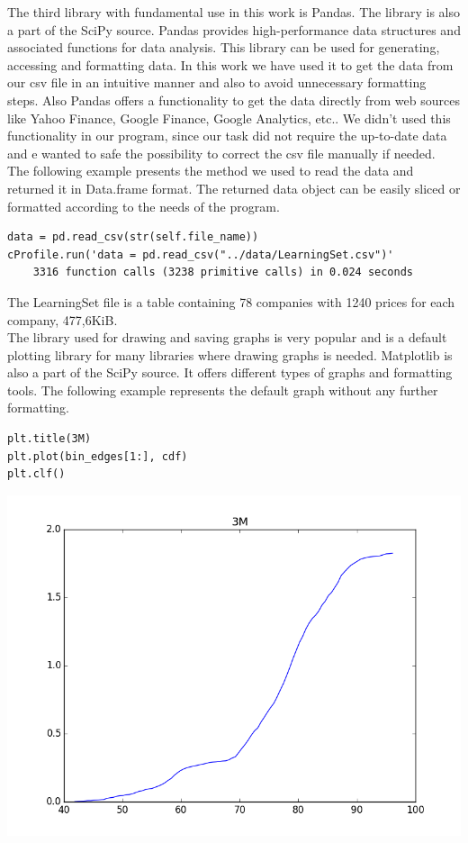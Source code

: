 \documentclass{article}
\begin{document}
The third library with fundamental use in this work is Pandas. The library is also a part of the SciPy source. Pandas provides high-performance data structures and associated functions for data analysis. This library can be used for generating, accessing and formatting data. In this work we have used it to get the data from our csv file in an intuitive manner and also to avoid unnecessary formatting steps. Also Pandas offers a functionality to get the data directly from web sources like Yahoo Finance, Google Finance, Google Analytics, etc.. We didn't used this functionality in our program, since our task did not require the up-to-date data and e wanted to safe the possibility to correct the csv file manually if needed. The following example presents the method we used to read the data and returned it in Data.frame format. The returned data object can be easily sliced or formatted according to the needs of the program.
\begin{verbatim}
data = pd.read_csv(str(self.file_name))
cProfile.run('data = pd.read_csv("../data/LearningSet.csv")'
    3316 function calls (3238 primitive calls) in 0.024 seconds
\end{verbatim}
The LearningSet file is a table containing 78 companies with 1240 prices for each company, 477,6KiB.\\
The library used for drawing and saving graphs is very popular and is a default plotting library for many libraries where drawing graphs is needed. Matplotlib is also a part of the SciPy source. It offers different types of graphs and formatting tools. The following example represents the default graph without any further formatting.
\begin{verbatim}
plt.title(3M)
plt.plot(bin_edges[1:], cdf)
plt.clf()
\end{verbatim}
\includegraphics[scale=0.75]{PythonPlotExample.png} \\
\end{document}
